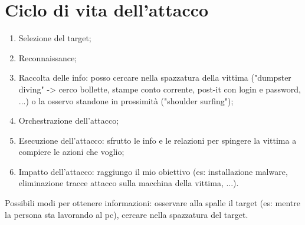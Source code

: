 \section{Ciclo di vita dell'attacco}
\begin{enumerate}
    \item Selezione del target;
    \item Reconnaissance;
    \item Raccolta delle info: posso cercare nella spazzatura della vittima ("dumpster diving" -> cerco bollette, stampe conto corrente, post-it con login e password, ...) o la osservo standone in prossimità ("shoulder surfing");
    \item Orchestrazione dell'attacco;
    \item Esecuzione dell'attacco: sfrutto le info e le relazioni per spingere la vittima a compiere le azioni che voglio;
    \item Impatto dell'attacco: raggiungo il mio obiettivo (es: installazione malware, eliminazione tracce attacco sulla macchina della vittima, ...).
\end{enumerate}

Possibili modi per ottenere informazioni: osservare alla spalle il target (es: mentre la persona sta lavorando al pc), cercare nella spazzatura del target.

